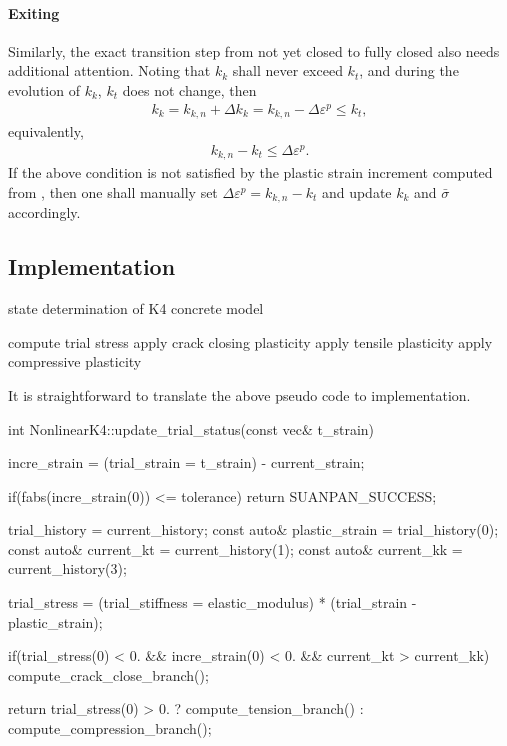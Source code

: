 \paragraph{Exiting}
Similarly, the exact transition step from not yet closed to fully closed also needs additional attention. Noting that $k_k$ shall never exceed $k_t$, and during the evolution of $k_k$, $k_t$ does not change, then
\begin{gather}
k_k=k_{k,n}+\Delta{}k_k=k_{k,n}-\Delta\varepsilon^p\leqslant{}k_t,
\end{gather}
equivalently,
\begin{gather}
k_{k,n}-k_t\leqslant{}\Delta\varepsilon^p.
\end{gather}
If the above condition is not satisfied by the plastic strain increment computed from , then one shall manually set $\Delta\varepsilon^p=k_{k,n}-k_t$ and update $k_k$ and $\bar{\sigma}$ accordingly.
\subsection{Implementation}
\begin{breakablealgorithm}
\caption{state determination of K4 concrete model}\label{algo:k4_concrete}
\begin{algorithmic}[1]
\State compute trial stress
\State apply crack closing plasticity
\EndIf
{}
\State apply tensile plasticity
\Else
\State apply compressive plasticity
\EndIf
\end{algorithmic}
\end{breakablealgorithm}

It is straightforward to translate the above pseudo code to implementation.
\begin{cppcode}
int NonlinearK4::update_trial_status(const vec& t_strain) {
    incre_strain = (trial_strain = t_strain) - current_strain;

    if(fabs(incre_strain(0)) <= tolerance) return SUANPAN_SUCCESS;

    trial_history = current_history;
    const auto& plastic_strain = trial_history(0);
    const auto& current_kt = current_history(1);
    const auto& current_kk = current_history(3);

    trial_stress = (trial_stiffness = elastic_modulus) * (trial_strain - plastic_strain);

    if(trial_stress(0) < 0. && incre_strain(0) < 0. && current_kt > current_kk) compute_crack_close_branch();

    return trial_stress(0) > 0. ? compute_tension_branch() : compute_compression_branch();
}
\end{cppcode}


